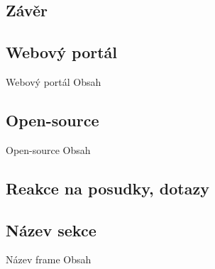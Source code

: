 \documentclass{beamer}
\begin{document}
    
  \begin{darkframes}
    \section{Závěr}
    \subsection{Webový portál}
    \begin{frame}{Webový portál}
     Obsah
    \end{frame}
    \subsection{Open-source}
    \begin{frame}{Open-source}
     Obsah
    \end{frame}
  \end{darkframes}
  
  \begin{frame}{}
\end{frame}
    
    
  \begin{darkframes}
    \section{Reakce na posudky, dotazy}
    \subsection{Název sekce}
    \begin{frame}{Název frame}
     Obsah
    \end{frame}
  \end{darkframes}
\end{document}
